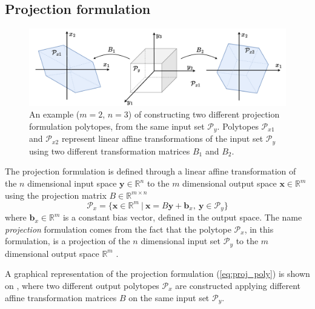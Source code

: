 \subsection{Projection formulation}
\label{ch:proj_formulaiton}

\begin{figure}[!h]
    \centering
    \includegraphics[width=0.8\linewidth]{Chapters/imgs/projection_double.pdf}
    \caption{An example ($m=2$, $n=3$) of constructing two different projection formulation polytopes, from the same input set $\mathcal{P}_y$. Polytopes $\mathcal{P}_{x1}$ and $\mathcal{P}_{x2}$ represent linear affine transformations of the input set $\mathcal{P}_y$ using two different transformation matrices $B_1$ and $B_2$.}
    \label{fig:proj_zono}
\end{figure}

The projection formulation is defined through a linear affine transformation of the $n$ dimensional input space $\bm{y}\in\mathbb{R}^n$ to the $m$ dimensional output space $\bm{x}\in\mathbb{R}^m$ using the projection matrix $B\in \mathbb{R}^{m\times n}$
\begin{equation}
    \mathcal{P}_x=\{\bm{x}\in \mathbb{R}^m ~|~ \bm{x} = B\bm{y} + \bm{b}_x,~\bm{y} \in\mathcal{P}_y \}
    \label{eq:proj_poly}
\end{equation}
where $\bm{b}_x\in\mathbb{R}^m$ is a constant bias vector, defined in the output space. The name \textit{projection} formulation comes from the fact that the polytope $\mathcal{P}_x$, in this formulation, is a projection of the $n$ dimensional input set $\mathcal{P}_y$ to the $m$ dimensional output space $\mathbb{R}^m$ \cite{Burger1996projection}.

A graphical representation of the projection formulation (\ref{eq:proj_poly}) is shown on , where two different output polytopes $\mathcal{P}_x$ are constructed applying different affine transformation matrices $B$ on the same input set $\mathcal{P}_y$.


